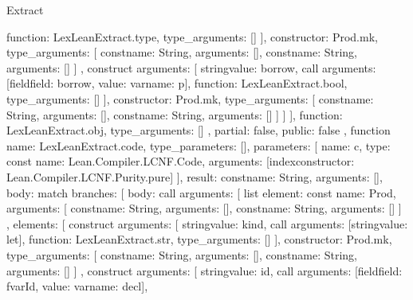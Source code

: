 \begin{lexlean}{Extract}
\begin{toolingmodule}
{{{{{{                    function: LexLeanExtract.type,
                    type_arguments: []
                  }
                ],
                constructor: Prod.mk,
                type_arguments: [
                  const{name: String, arguments: []},
                  const{name: String, arguments: []}
                ]
              },
              construct{
                arguments: [
                  string{value: borrow},
                  call{
                    arguments: [field{field: borrow, value: var{name: p}}],
                    function: LexLeanExtract.bool,
                    type_arguments: []
                  }
                ],
                constructor: Prod.mk,
                type_arguments: [
                  const{name: String, arguments: []},
                  const{name: String, arguments: []}
                ]
              }
            ]
          }
        ],
        function: LexLeanExtract.obj,
        type_arguments: []
      },
      partial: false,
      public: false
    },
    function{
      name: LexLeanExtract.code,
      type_parameters: [],
      parameters: [
        {
          name: c,
          type: const{
            name: Lean.Compiler.LCNF.Code,
            arguments: [index{constructor: Lean.Compiler.LCNF.Purity.pure}]
          }
        }
      ],
      result: const{name: String, arguments: []},
      body: match{
        branches: [
          {
            body: call{
              arguments: [
                list{
                  element: const{
                    name: Prod,
                    arguments: [
                      const{name: String, arguments: []},
                      const{name: String, arguments: []}
                    ]
                  },
                  elements: [
                    construct{
                      arguments: [
                        string{value: kind},
                        call{
                          arguments: [string{value: let}],
                          function: LexLeanExtract.str,
                          type_arguments: []
                        }
                      ],
                      constructor: Prod.mk,
                      type_arguments: [
                        const{name: String, arguments: []},
                        const{name: String, arguments: []}
                      ]
                    },
                    construct{
                      arguments: [
                        string{value: id},
                        call{
                          arguments: [field{field: fvarId, value: var{name: decl}}],
}}}}}}}}
\end{toolingmodule}
\end{lexlean}
